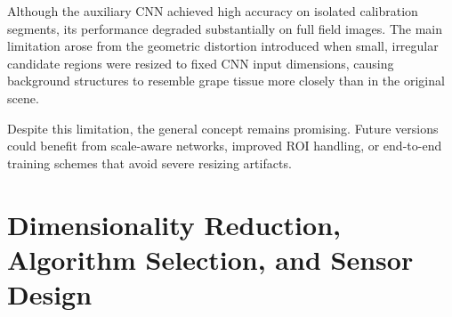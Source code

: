 \noindent
Although the auxiliary CNN achieved high accuracy on isolated calibration segments, its performance degraded substantially on full field images. The main limitation arose from the geometric distortion introduced when small, irregular candidate regions were resized to fixed CNN input dimensions, causing background structures to resemble grape tissue more closely than in the original scene.

\medskip\noindent
Despite this limitation, the general concept remains promising. Future versions could benefit from scale-aware networks, improved ROI handling, or end-to-end training schemes that avoid severe resizing artifacts.

\clearpage
\section{Dimensionality Reduction, Algorithm Selection, and Sensor Design}
\label{sec:dimensionality_and_sensors}




